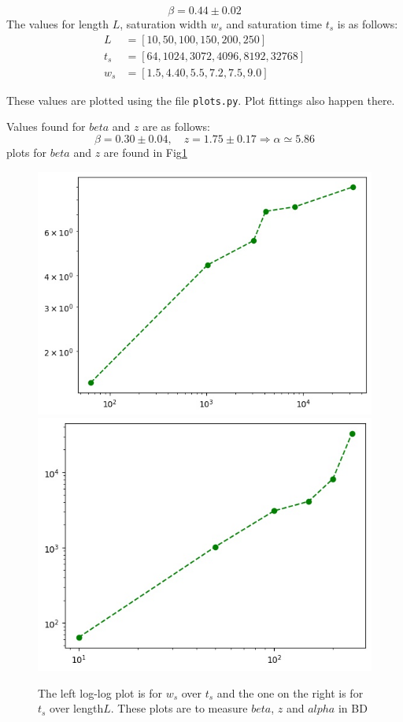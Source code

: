 \documentclass[12pt]{article}
\begin{document}
\begin{equation*}
	\beta = 0.44 \pm 0.02
\end{equation*}
The values for length $L$, saturation width $w_s$ and saturation time $t_s$ is as follows:
\begin{equation*}
	\begin{aligned}
		L		 &= [10, 50, 100, 150, 200, 250]\\
		t_s		&= [64, 1024, 3072, 4096, 8192, 32768]\\
		w_s	  &= [1.5, 4.40, 5.5, 7.2, 7.5, 9.0] 
	\end{aligned}
\end{equation*}

These values are plotted using the file \texttt{plots.py}. Plot fittings also happen there.

Values found for $beta$ and $z$ are as follows:
\begin{equation*}
	\beta = 0.30 \pm 0.04, \quad z = 1.75 \pm 0.17  \Rightarrow \alpha \simeq 5.86
\end{equation*}
plots for $beta$ and $z$ are found in Fig\ref{fig:BDbeta_z}
\begin{figure}[h!]
	\centering
	\includegraphics[width=.4\linewidth]{../P6/beta.jpg}
	\includegraphics[width=.4\linewidth]{../P6/z.jpg}
	\label{fig:BDbeta_z}
	\caption{The left log-log plot is for $w_s$ over $t_s$ and the one on the right is for 
		$t_s$ over length$L$. These plots are to measure $beta$, $z$ and $alpha$ in BD}
\end{figure}
	
\end{document}
